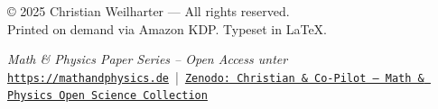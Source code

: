 \documentclass[12pt,oneside]{scrartcl}
\begin{document}
	\vspace{0.8cm}
	
	\noindent
	\footnotesize
	© 2025 Christian Weilharter — All rights reserved.\\
	Printed on demand via Amazon KDP. Typeset in \LaTeX.
	
	\vfill
	\begin{center}
		\textit{Math \& Physics Paper Series – Open Access unter}\\[3pt]
		\href{https://mathandphysics.de}{\texttt{https://mathandphysics.de}} 
		\,|\, 
		\href{https://zenodo.org/communities/christian-copilot/records?q=&l=list&p=1&s=10&sort=newest}{\texttt{Zenodo: Christian \& Co-Pilot – Math \& Physics Open Science Collection}}
	\end{center}
	
	
\end{document}
